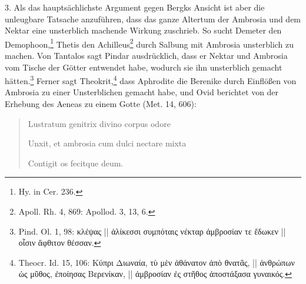 \documentclass[a4paper, 11pt, oneside]{article}
\begin{document}
3. Als das hauptsächlichste Argument gegen Bergks Ansicht ist aber die unleugbare Tatsache anzuführen, dass das ganze Altertum der Ambrosia und dem Nektar eine unsterblich machende Wirkung zuschrieb. So sucht Demeter den Demophoon,\footnote{Hy. in Cer. 236.} Thetis den Achilleus\footnote{Apoll. Rh. 4, 869: Apollod. 3, 13, 6.} durch Salbung mit Ambrosia unsterblich zu machen. Von Tantalos sagt Pindar ausdrücklich, dass er Nektar und Ambrosia vom Tische der Götter entwendet habe, wodurch sie ihn unsterblich gemacht hätten.\footnote{Pind. Ol. 1, 98: κλέψας || ἁλίκεσσι συμπόταις νέκταρ ἀμβροσίαν τε ἔδωκεν || οἷσιν ἄφθιτον θέσσαν.} Ferner sagt Theokrit,\footnote{Theocr. Id. 15, 106: Κύπρι Διωναία, τὺ μὲν ἀθάνατον ἀπὸ θνατᾶς, || ἀνθρώπων ὡς μῦθος, ἐποίησας Βερενίκαν, || ἀμβροσίαν ἐς στῆθος ἀποστάξασα γυναικός.} dass Aphrodite die Berenike durch Einflößen von Ambrosia zu einer Unsterblichen gemacht habe, und Ovid berichtet von der Erhebung des Aeneas zu einem Gotte (Met. 14, 606):
\begin{quotation}\large
Lustratum genitrix divino corpus odore

Unxit, et ambrosia cum dulci nectare mixta

Contigit os fecitque deum.
\end{quotation}
\end{document}
